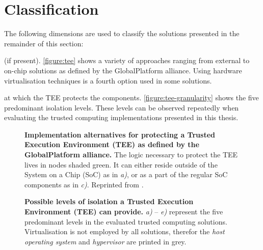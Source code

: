 \section{Classification\label{ID_979419236}}
The following dimensions are used to classify the solutions presented in the remainder of this section:\label{ID_1876235781}
\begin{description}\label{ID_385656837}
\item[Hardware implementation] (if present). \autoref{figure:tee} shows a variety of approaches ranging from external to on-chip solutions as defined by the GlobalPlatform alliance.\cite[]{GlobalPlatform}\label{ID_205762418}
Using hardware virtualisation techniques is a fourth option used in some solutions.\label{ID_472468399}
\item[Isolation level] at which the TEE protects the components. \autoref{figure:tee-granularity} shows the five predominant isolation levels. These levels can be observed repeatedly when evaluating the trusted computing implementations presented in this thesis.\label{ID_466621036}
\end{description}\label{ID_1293092830}
\begin{figure}[htbp]
\makebox[\textwidth][c]{
}\caption{\textbf{Implementation alternatives for protecting a Trusted Execution Environment (TEE) as defined by the GlobalPlatform alliance.}\label{ID_1049041551}
The logic necessary to protect the TEE lives in nodes shaded green. It can either reside outside of the System on a Chip (SoC) as in \textit{a)}, or as a part of the regular SoC components as in \textit{c)}.\label{ID_377511617}
Reprinted from \cite{GlobalPlatform}.\label{ID_1243979231}
\label{ID_1516783594}\label{figure:tee}}
\end{figure}

\begin{figure}[htbp]
\makebox[\textwidth][c]{
}\caption{\textbf{Possible levels of isolation a Trusted Execution Environment (TEE) can provide.}\label{ID_1446907066}
\textit{a)} -- \textit{e)} represent the five predominant levels in the evaluated trusted computing solutions. Virtualisation is not employed by all solutions, therefor the \textit{host operating system} and \textit{hypervisor} are printed in grey.\label{ID_1739628616}
\label{ID_1112289760}\label{figure:tee-granularity}}
\end{figure}


